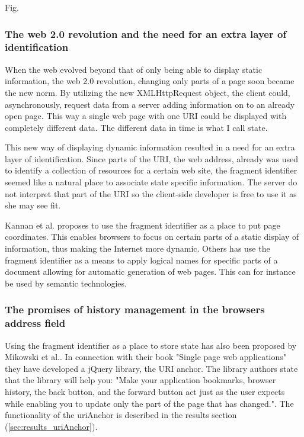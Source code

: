 \documentclass[english]{ifimaster}
\begin{document}
Fig.

\subsubsection{The web 2.0 revolution and the need for an extra layer of identification}
When the web evolved beyond that of only being able to display static information, the web 2.0 revolution, changing only parts of a page soon became the new norm. By utilizing the new XMLHttpRequest object, the client could, asynchronously, request data from a server adding information on to an already open page. This way a single web page with one URI could be displayed with completely different data. The different data in time is what I call state.

\label{sec:storingState}
This new way of displaying dynamic information resulted in a need for an extra layer of identification. Since parts of the URI, the web address, already was used to identify a collection of resources for a certain web site, the fragment identifier seemed like a natural place to associate state specific information. The server do not interpret that part of the URI so the client-side developer is free to use it as she may see fit. 

Kannan et al. proposes to use the fragment identifier as a place to put page coordinates. This enables browsers to focus on certain parts of a static display of information, thus making the Internet more dynamic\parencite{Kannan:2006:LUB:1135777.1135924}. Others has use the fragment identifier as a means to apply logical names for specific parts of a document allowing for automatic generation of web pages\parencite{Aimar199599}. This can for instance be used by semantic technologies. 

\subsubsection{The promises of history management in the browsers address field}
\label{sec:uriAnchor}
Using the fragment identifier as a place to store state has also been proposed by Mikowski et al.\parencite{mikowski}. In connection with their book "Single page web applications" they have developed a jQuery library, the URI anchor. The library authors state that the library will help you: "Make your application bookmarks, browser history, the back button, and the forward button act just as the user expects while enabling you to update only the part of the page that has changed."\parencite{urianchor}. The functionality of the uriAnchor is described in the results section (\ref{sec:results_uriAnchor}). 
\end{document}
